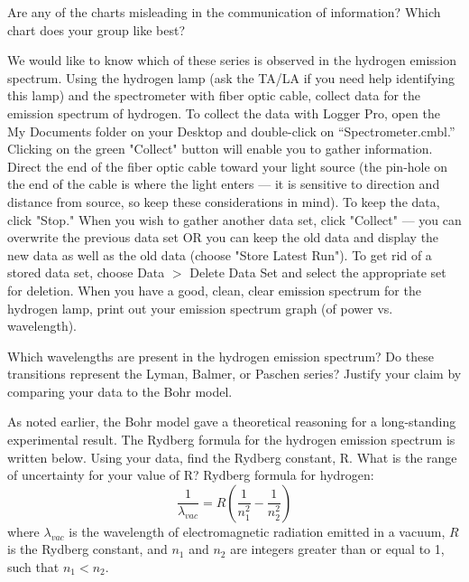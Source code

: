 Are any of the charts misleading in the communication of information? 
Which chart does your group like best?
\par
We would like to know which of these series is observed in the hydrogen emission spectrum.
Using the hydrogen lamp (ask the TA/LA if you need help identifying this lamp) and the spectrometer with fiber optic cable, collect data for the emission spectrum of hydrogen. 
To collect the data with Logger Pro, open the My Documents folder on your Desktop and double-click on “Spectrometer.cmbl.” 
Clicking on the green "Collect" button will enable you to gather information.
Direct the end of the fiber optic cable toward your light source (the pin-hole on the end of the cable is where the light enters — it is sensitive to direction and distance from source, so keep these considerations in mind). 
To keep the data, click "Stop." 
When you wish to gather another data set, click "Collect" — you can overwrite the previous data set OR you can keep the old data and display the new data as well as the old data (choose "Store Latest Run"). 
To get rid of a stored data set, choose Data $>$ Delete Data Set and select the appropriate set for deletion. 
When you have a good, clean, clear emission spectrum for the hydrogen lamp, print out your emission spectrum graph (of power vs. wavelength).
\par 
Which wavelengths are present in the hydrogen emission spectrum? 
Do these transitions represent the Lyman, Balmer, or Paschen series? 
Justify your claim by comparing your data to the Bohr model. 
\par 
As noted earlier, the Bohr model gave a theoretical reasoning for a long-standing experimental result. 
The Rydberg formula for the hydrogen emission spectrum is written below. 
Using your data, find the Rydberg constant, R. 
What is the range of uncertainty for your value of R?
\vfill
\noindent
Rydberg formula for hydrogen:
\[ \frac{1}{\lambda_{vac}} = R \left( \frac{1}{n_{1}^{2}} - \frac{1}{n_{2}^{2}} \right) \]
where $ \lambda_{vac} $ is the wavelength of electromagnetic radiation emitted in a vacuum, $R$ is the Rydberg constant, and $n_{1}$ and $n_{2}$ are integers greater than or equal to 1, such that $n_{1} < n_{2}$.

\newpage

